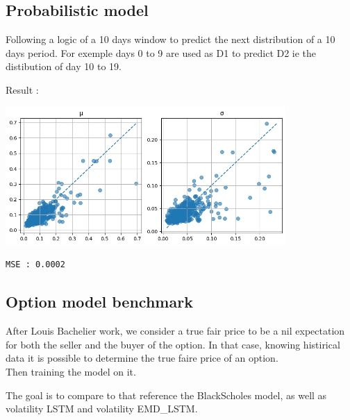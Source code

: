 \documentclass[letterpaper,11pt]{article}
\begin{document}
\subsection*{Probabilistic model}

Following a logic of a 10 days window to predict the next distribution of a 10 days period. For exemple days 0 to 9 are used as D1 to predict D2 ie the distibution of day 10 to 19.\\

\bigskip

Result :

\begin{center}
\includegraphics[width=0.8\textwidth]{img/prob_model_res.png}
\end{center}
\begin{verbatim}
MSE : 0.0002
\end{verbatim}




\subsection*{Option model benchmark}
After Louis Bachelier work, we consider a true fair price to be a nil expectation for both the seller and the buyer of the option.
In that case, knowing histirical data it is possible to determine the true faire price of an option.\\
Then training the model on it.\\

\bigskip

The goal is to compare to that reference the Black\-Scholes model, as well as volatility LSTM and volatility EMD\_LSTM.\\

\bigskip
%
%
\end{document}
